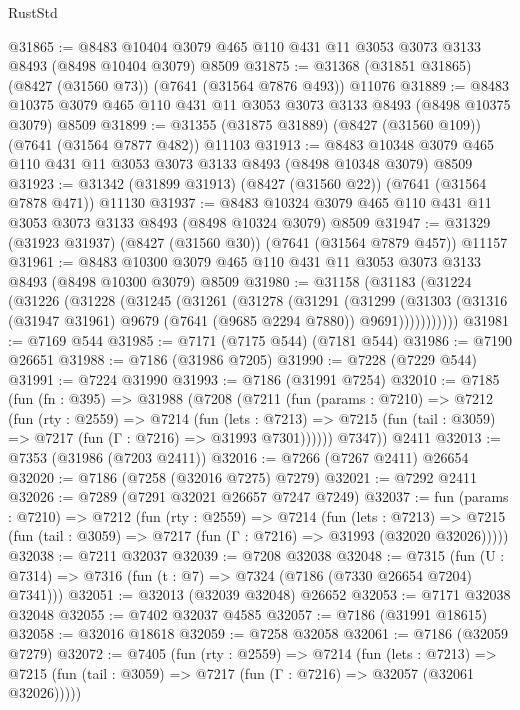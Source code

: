 \begin{lexlean}{RustStd}
\begin{coremodule}
@31865 := @8483 @10404 @3079 @465 @110 @431 @11 @3053 @3073 @3133 @8493 (@8498 @10404 @3079) @8509
@31875 := @31368 (@31851 @31865) (@8427 (@31560 @73)) (@7641 (@31564 @7876 @493)) @11076
@31889 := @8483 @10375 @3079 @465 @110 @431 @11 @3053 @3073 @3133 @8493 (@8498 @10375 @3079) @8509
@31899 := @31355 (@31875 @31889) (@8427 (@31560 @109)) (@7641 (@31564 @7877 @482)) @11103
@31913 := @8483 @10348 @3079 @465 @110 @431 @11 @3053 @3073 @3133 @8493 (@8498 @10348 @3079) @8509
@31923 := @31342 (@31899 @31913) (@8427 (@31560 @22)) (@7641 (@31564 @7878 @471)) @11130
@31937 := @8483 @10324 @3079 @465 @110 @431 @11 @3053 @3073 @3133 @8493 (@8498 @10324 @3079) @8509
@31947 := @31329 (@31923 @31937) (@8427 (@31560 @30)) (@7641 (@31564 @7879 @457)) @11157
@31961 := @8483 @10300 @3079 @465 @110 @431 @11 @3053 @3073 @3133 @8493 (@8498 @10300 @3079) @8509
@31980 := @31158
    (@31183
      (@31224
        (@31226
          (@31228
            (@31245
              (@31261
                (@31278
                  (@31291
                    (@31299
                      (@31303
                        (@31316 (@31947 @31961) @9679 (@7641 (@9685 @2294 @7880)) @9691)))))))))))
@31981 := @7169 @544
@31985 := @7171 (@7175 @544) (@7181 @544)
@31986 := @7190 @26651
@31988 := @7186 (@31986 @7205)
@31990 := @7228 (@7229 @544)
@31991 := @7224 @31990
@31993 := @7186 (@31991 @7254)
@32010 := @7185
    (fun (fn : @395) =>
    @31988
      (@7208
        (@7211
          (fun (params : @7210) =>
          @7212
            (fun (rty : @2559) =>
            @7214
              (fun (lets : @7213) =>
              @7215 (fun (tail : @3059) => @7217 (fun (Γ : @7216) => @31993 @7301))))))
        @7347))
    @2411
@32013 := @7353 (@31986 (@7203 @2411))
@32016 := @7266 (@7267 @2411) @26654
@32020 := @7186 (@7258 (@32016 @7275) @7279)
@32021 := @7292 @2411
@32026 := @7289 (@7291 @32021 @26657 @7247 @7249)
@32037 := fun (params : @7210) =>
  @7212
    (fun (rty : @2559) =>
    @7214
      (fun (lets : @7213) =>
      @7215 (fun (tail : @3059) => @7217 (fun (Γ : @7216) => @31993 (@32020 @32026)))))
@32038 := @7211 @32037
@32039 := @7208 @32038
@32048 := @7315
    (fun (U : @7314) => @7316 (fun (t : @7) => @7324 (@7186 (@7330 @26654 @7204) @7341)))
@32051 := @32013 (@32039 @32048) @26652
@32053 := @7171 @32038 @32048
@32055 := @7402 @32037 @4585
@32057 := @7186 (@31991 @18615)
@32058 := @32016 @18618
@32059 := @7258 @32058
@32061 := @7186 (@32059 @7279)
@32072 := @7405
    (fun (rty : @2559) =>
    @7214
      (fun (lets : @7213) =>
      @7215 (fun (tail : @3059) => @7217 (fun (Γ : @7216) => @32057 (@32061 @32026)))))

\end{coremodule}
\end{lexlean}
